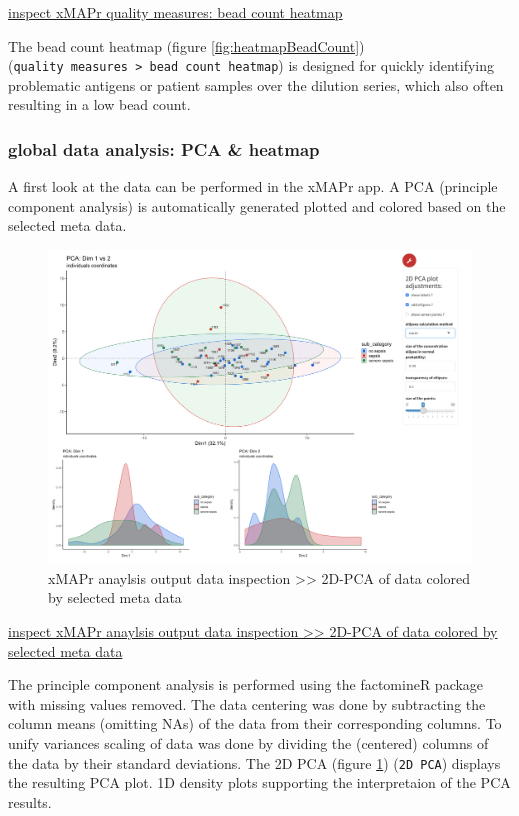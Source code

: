 \documentclass[]{book}
\theoremstyle{definition}
\theoremstyle{definition}
\theoremstyle{definition}
\theoremstyle{remark}
\begin{document}
\href{figures/quality_measures__bead_count_heatmap.png}{inspect xMAPr
quality measures: bead count heatmap}

The bead count heatmap (figure \ref{fig:heatmapBeadCount})
(\texttt{quality\ measures\ \textgreater{}\ bead\ count\ heatmap}) is
designed for quickly identifying problematic antigens or patient samples
over the dilution series, which also often resulting in a low bead
count.

\subsubsection{global data analysis: PCA \&
heatmap}\label{global-data-analysis-pca-heatmap}

A first look at the data can be performed in the xMAPr app. A PCA
(principle component analysis) is automatically generated plotted and
colored based on the selected meta data.

\begin{figure}

{\centering \includegraphics[width=42.36in]{figures/global_result_overview_PCA} 

}

\caption{xMAPr anaylsis output data inspection >> 2D-PCA of data colored by selected meta data}\label{fig:PCA2D}
\end{figure}

\href{figures/global_result_overview_PCA.png}{inspect xMAPr anaylsis
output data inspection \textgreater{}\textgreater{} 2D-PCA of data
colored by selected meta data}

The principle component analysis is performed using the factomineR
package with missing values removed. The data centering was done by
subtracting the column means (omitting NAs) of the data from their
corresponding columns. To unify variances scaling of data was done by
dividing the (centered) columns of the data by their standard
deviations. The 2D PCA (figure \ref{fig:PCA2D}) (\texttt{2D\ PCA})
displays the resulting PCA plot. 1D density plots supporting the
interpretaion of the PCA results.
\end{document}

